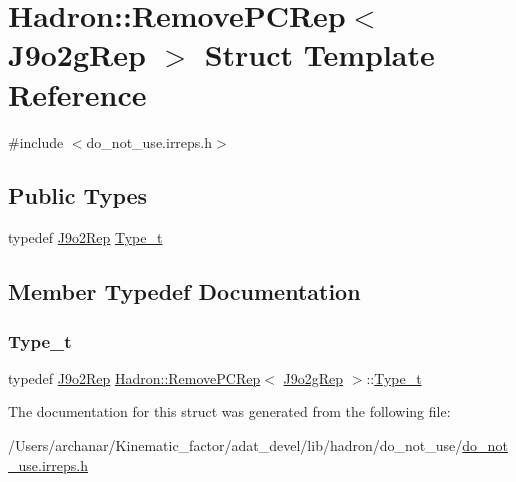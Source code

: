 \hypertarget{structHadron_1_1RemovePCRep_3_01J9o2gRep_01_4}{}\section{Hadron\+:\+:Remove\+P\+C\+Rep$<$ J9o2g\+Rep $>$ Struct Template Reference}
\label{structHadron_1_1RemovePCRep_3_01J9o2gRep_01_4}


{\ttfamily \#include $<$do\+\_\+not\+\_\+use.\+irreps.\+h$>$}

\subsection*{Public Types}
\begin{DoxyCompactItemize}
\item 
typedef \mbox{\hyperlink{structHadron_1_1J9o2Rep}{J9o2\+Rep}} \mbox{\hyperlink{structHadron_1_1RemovePCRep_3_01J9o2gRep_01_4_ae7806eeb69b1c9624bc8e9aec21d9346}{Type\+\_\+t}}
\end{DoxyCompactItemize}


\subsection{Member Typedef Documentation}
\mbox{\label{structHadron_1_1RemovePCRep_3_01J9o2gRep_01_4_ae7806eeb69b1c9624bc8e9aec21d9346}} 
\subsubsection{\texorpdfstring{Type\_t}{Type\_t}}
{\footnotesize\ttfamily typedef \mbox{\hyperlink{structHadron_1_1J9o2Rep}{J9o2\+Rep}} \mbox{\hyperlink{structHadron_1_1RemovePCRep}{Hadron\+::\+Remove\+P\+C\+Rep}}$<$ \mbox{\hyperlink{structHadron_1_1J9o2gRep}{J9o2g\+Rep}} $>$\+::\mbox{\hyperlink{structHadron_1_1RemovePCRep_3_01J9o2gRep_01_4_ae7806eeb69b1c9624bc8e9aec21d9346}{Type\+\_\+t}}}



The documentation for this struct was generated from the following file\+:\begin{DoxyCompactItemize}
\item 
/\+Users/archanar/\+Kinematic\+\_\+factor/adat\+\_\+devel/lib/hadron/do\+\_\+not\+\_\+use/\mbox{\hyperlink{do__not__use_8irreps_8h}{do\+\_\+not\+\_\+use.\+irreps.\+h}}\end{DoxyCompactItemize}
